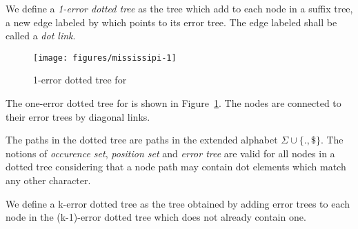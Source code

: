 \begin{definition}
We define a \emph{1-error dotted tree} as the tree which add to each node in a suffix tree, a new edge labeled by  which points to its error tree. The edge labeled  shall be called a \emph{dot link}.
\end{definition}

\begin{figure}
\texttt{[image: figures/mississipi-1]}
\caption{1-error dotted tree for }%
\label{fig:mississipi-1}
\end{figure}

The one-error dotted tree for  is shown in Figure~\ref{fig:mississipi-1}. The nodes are connected to their error trees by diagonal links.

The paths in the dotted tree are paths in the extended alphabet $\Sigma\cup\{.,\$\}$. The notions of \emph{occurence set}, \emph{position set} and \emph{error tree} are valid for all nodes in a dotted tree considering that a node path may contain dot elements which match any other character.

\begin{definition}
We define a k-error dotted tree as the tree obtained by adding error trees to each node in the (k-1)-error dotted tree which does not already contain one.
\end{definition}

